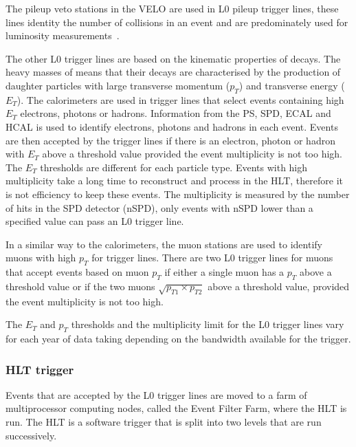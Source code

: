 The pileup veto stations in the VELO are used in L0 pileup trigger lines, these lines identity the number of collisions in an event and are predominately used for luminosity measurements~\cite{Aaij:2011er}.

The other L0 trigger lines are based on the kinematic properties of \bhadron decays. The heavy masses of \bhadrons means that their decays are characterised by the production of daughter particles with large transverse momentum ($p_{T}$) and transverse energy ($E_{T}$).
The calorimeters are used in trigger lines that select events containing high $E_{T}$ electrons, photons or hadrons. Information from the PS, SPD, ECAL and HCAL is used to identify electrons, photons and hadrons in each event. Events are then accepted by the trigger lines if there is an electron, photon or hadron with $E_{T}$ above a threshold value provided the event multiplicity is not too high. The $E_{T}$ thresholds are different for each particle type. Events with high multiplicity take a long time to reconstruct and process in the HLT, therefore it is not efficiency to keep these events. The multiplicity is measured by the number of hits in the SPD detector (nSPD), only events with nSPD lower than a specified value can pass an L0 trigger line. 


In a similar way to the calorimeters, the muon stations are used to identify muons with high $p_{T}$ for trigger lines. There are two L0 trigger lines for muons that accept events based on muon $p_{T}$ if either a single muon has a $p_{T}$ above a threshold value or if the two muons $\sqrt{p_{T1} \times p_{T2}}$ above a threshold value, provided the event multiplicity is not too high. %

The $E_{T}$ and $p_{T}$ thresholds and the multiplicity limit for the L0 trigger lines vary for each year of data taking depending on the bandwidth available for the trigger. %


\subsubsection{HLT trigger}
\label{HLT}

Events that are accepted by the L0 trigger lines are moved to a farm of multiprocessor computing nodes, called the Event Filter Farm, where the HLT is run. The HLT is a software trigger that is split into two levels that are run successively. 

